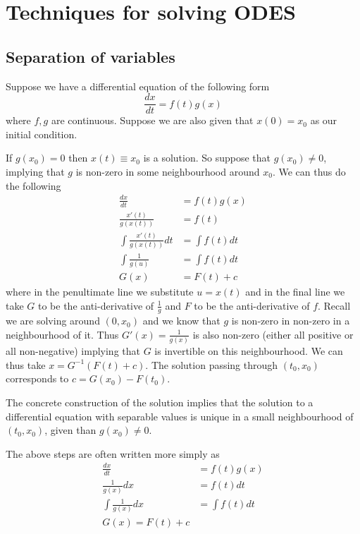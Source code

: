 \section{Techniques for solving ODES}

\subsection{Separation of variables} \label{sec:sep-of-var}
Suppose we have a differential equation of the following form
$$ \frac{dx}{dt} = f(t) g(x) $$
where $f, g$ are continuous. Suppose we are also given that $x(0) = x_0$ as our initial condition.

If $g(x_0) = 0$ then $x(t) \equiv x_0$ is a solution. So suppose that $g(x_0) \neq 0$, implying that $g$ is non-zero in some neighbourhood around $x_0$. We can thus do the following
\begin{align*}
    \frac{dx}{dt} &= f(t) g(x)\\
    \frac{x'(t)}{g(x(t))} &= f(t)\\
    \int \frac{x'(t)}{g(x(t))} dt &= \int f(t) dt\\
    \int \frac{1}{g(u)} &= \int f(t) dt\\
    G(x) &= F(t) + c
\end{align*}
where in the penultimate line we substitute $u = x(t)$ and in the final line we take $G$ to be the anti-derivative of $\frac{1}{g}$ and $F$ to be the anti-derivative of $f$. Recall we are solving around $(0, x_0)$ and we know that $g$ is non-zero in non-zero in a neighbourhood of it. Thus $G'(x) = \frac{1}{g(x)}$ is also non-zero (either all positive or all non-negative) implying that $G$ is invertible on this neighbourhood. We can thus take $x = G^{-1}(F(t) + c)$. The solution passing through $(t_0, x_0)$ corresponds to $c = G(x_0) - F(t_0)$.

\begin{remark}
The concrete construction of the solution implies that the solution to a differential equation with separable values is unique in a small neighbourhood of $(t_0, x_0)$, given than $g(x_0) \neq 0$.
\end{remark}

The above steps are often written more simply as 
\begin{align*}
    \frac{dx}{dt} &= f(t) g(x)\\
    \frac{1}{g(x)} dx &= f(t) dt\\
    \int \frac{1}{g(x)} dx &= \int f(t) dt\\
    G(x) = F(t) + c
\end{align*}


